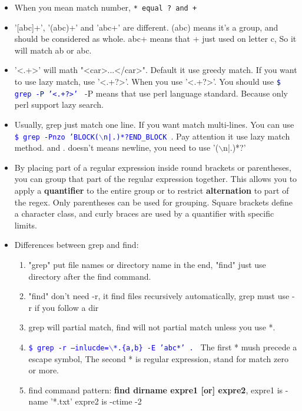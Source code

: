 \documentclass[a4paper,12pt,twoside]{book}
\newcommand{\linuxcommand}[1]{\texttt{\textcolor{blue}{\$ #1 \Pisymbol{psy}{191}}}}
\begin{document}
\begin{itemize}
\begin{tabular}{p{}|p{}|p{}}
\hline 
\end{tabular}

		\item When you mean match number, \verb=* equal ? and + = 

		\item '[abc]+',  '(abc)+' and 'abc+' are different.  (abc) means it's a group, and should be considered as whole. abc+ means that + just used on letter c, So it will match ab or abc.  

		\item '<.+>' will math "<car>...</car>". Default it use greedy match. If you want to use lazy match, use '<.+?>'. When you use '<.+?>'.  You should use \linuxcommand{grep -P '<.+?>'} -P means that use perl language standard. Because only perl support lazy search.  

		\item Usually, grep just match one line. If you want match multi-lines. You can use \linuxcommand{grep -Pnzo 'BLOCK($\backslash$n|.)*?END\_BLOCK }.  Pay attention it use lazy match method. and . doesn't means newline, you need to use '($\backslash$n|.)*?'

		\item By placing part of a regular expression inside round brackets or parentheses, you can group that part of the regular expression together. This allows you to apply a \textbf{quantifier} to the entire group or to restrict \textbf{alternation} to part of the regex.  Only parentheses can be used for grouping. Square brackets define a character class, and curly braces are used by a quantifier with specific limits.

		\item Differences between grep and find:
		\begin{enumerate}
				\item "grep" put file names or directory name in the end, "find" just use directory after the find command.
				\item "find" don't need -r, it find files recursively automatically, grep must use -r if you follow a dir

				\item grep will partial match, find will not partial match unless you use *.

				\item \linuxcommand{grep -r --inlucde=$\backslash$*.\{a,b\} -E 'abc*' .} The first * mush precede a escape symbol, The second * is regular expression, stand for match zero or more. 

				\item find command pattern: \textbf{find dirname expre1 [or] expre2}, expre1 is -name '*.txt' expre2 is -ctime -2 
		\end{enumerate}
\end{itemize}
\end{document}
